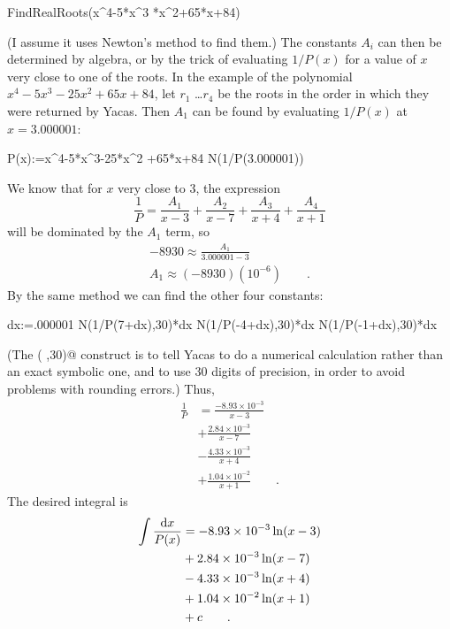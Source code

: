 \begin{Code}
  \ii FindRealRoots(x^4-5*x^3
  *x^2+65*x+84)
\end{Code}

(I assume it uses Newton's method to find them.) The constants
$A_i$ can then be determined by algebra, or by the trick of evaluating
$1/P(x)$ for a value of $x$ very close to one of the roots.
In the example of the polynomial 
$x^4-5x^3-25x^2+65x+84$, let $r_1$ \ldots $r_4$ be the roots in the
order in which they were returned by Yacas. Then $A_1$ can be
found by evaluating $1/P(x)$ at $x=3.000001$:

\begin{Code}
  \ii P(x):=x^4-5*x^3-25*x^2
  \ii   +65*x+84
  \ii N(1/P(3.000001))
\end{Code}

We know that for $x$ very close to 3, the expression
\begin{equation*}
  \frac{1}{P} = \frac{A_1}{x-3}+\frac{A_2}{x-7}+\frac{A_3}{x+4}+\frac{A_4}{x+1}
\end{equation*}
will be dominated by the $A_1$ term, so
\begin{gather*}
  -8930 \approx \frac{A_1}{3.000001-3} \\
  A_1 \approx (-8930)(10^{-6})  \qquad .
\end{gather*}
By the same method we can find the other four constants:
\begin{Code}
  \ii dx:=.000001
  \ii N(1/P(7+dx),30)*dx
  \ii N(1/P(-4+dx),30)*dx
  \ii N(1/P(-1+dx),30)*dx
\end{Code}
(The \verb@N( ,30)@ construct is to tell Yacas to do a numerical calculation rather than an exact
symbolic one, and to use 30 digits of precision, in order to
avoid problems with rounding errors.) Thus, \begin{align*}
  \frac{1}{P} &= \frac{-8.93\times10^{-3}}{x-3} \\
              &+ \frac{2.84\times10^{-3}}{x-7} \\
              &- \frac{4.33\times10^{-3}}{x+4} \\
              &+ \frac{1.04\times10^{-2}}{x+1} \qquad .
\end{align*}
The desired integral is
\begin{align*}
  \int \frac{\textup{d} x}{P(x)} &= -8.93\times10^{-3}\ln(x-3) \\
              & +2.84\times10^{-3}\ln(x-7) \\
              & -4.33\times10^{-3}\ln(x+4) \\
              &+ 1.04\times10^{-2}\ln(x+1) \\
              &+c \qquad .
\end{align*}

